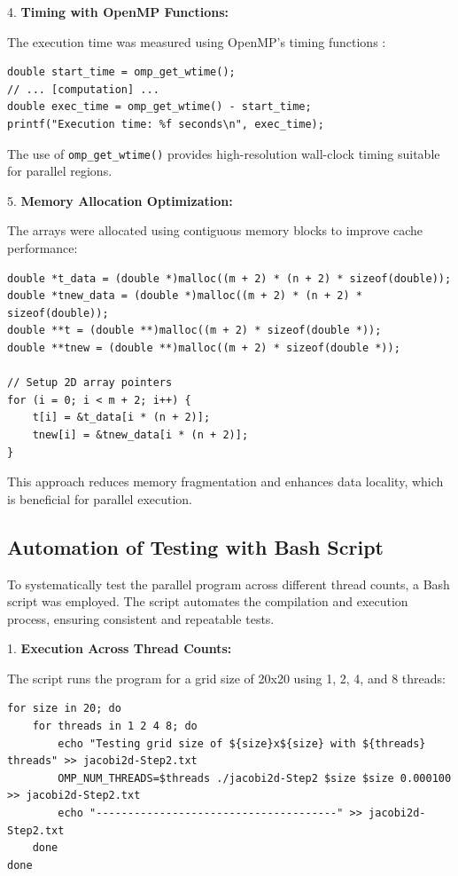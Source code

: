 \documentclass{article}
\begin{document}
4. \textbf{Timing with OpenMP Functions:}

    The execution time was measured using OpenMP's timing functions \parencite{openmp}:

\begin{lstlisting}[style=CStyle, caption={Timing with OpenMP Functions}]
double start_time = omp_get_wtime();
// ... [computation] ...
double exec_time = omp_get_wtime() - start_time;
printf("Execution time: %f seconds\n", exec_time);
\end{lstlisting}

   The use of \texttt{omp\_get\_wtime()} provides high-resolution wall-clock timing suitable for parallel regions.

5. \textbf{Memory Allocation Optimization:}

   The arrays were allocated using contiguous memory blocks to improve cache performance:

\begin{lstlisting}[style=CStyle, caption={Memory Allocation Optimization}]
double *t_data = (double *)malloc((m + 2) * (n + 2) * sizeof(double));
double *tnew_data = (double *)malloc((m + 2) * (n + 2) * sizeof(double));
double **t = (double **)malloc((m + 2) * sizeof(double *));
double **tnew = (double **)malloc((m + 2) * sizeof(double *));

// Setup 2D array pointers
for (i = 0; i < m + 2; i++) {
    t[i] = &t_data[i * (n + 2)];
    tnew[i] = &tnew_data[i * (n + 2)];
}
\end{lstlisting}

   This approach reduces memory fragmentation and enhances data locality, which is beneficial for parallel execution.

\subsection{Automation of Testing with Bash Script}

To systematically test the parallel program across different thread counts, a Bash script was employed. The script automates the compilation and execution process, ensuring consistent and repeatable tests.

1. \textbf{Execution Across Thread Counts:}

   The script runs the program for a grid size of 20x20 using 1, 2, 4, and 8 threads:

\begin{lstlisting}[style=BashStyle, caption={Execution Across Thread Counts}]
for size in 20; do
    for threads in 1 2 4 8; do
        echo "Testing grid size of ${size}x${size} with ${threads} threads" >> jacobi2d-Step2.txt
        OMP_NUM_THREADS=$threads ./jacobi2d-Step2 $size $size 0.000100 >> jacobi2d-Step2.txt
        echo "--------------------------------------" >> jacobi2d-Step2.txt
    done
done
\end{lstlisting}
\end{document}
